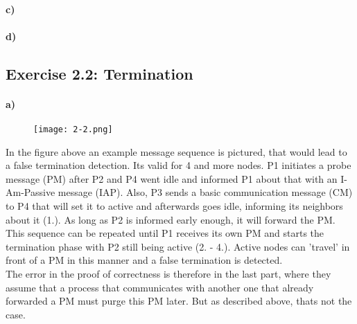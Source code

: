 \documentclass[12pt,a4paper]{article}
\begin{document}
\paragraph{c)} %
\paragraph{d)} %

\subsection*{Exercise 2.2: Termination}
\paragraph*{a)} %
\begin{figure}[h]
\centering
 \texttt{[image: 2-2.png]}
\end{figure}
In the figure above an example message sequence is pictured, that would lead to a false termination detection. Its valid for 4
and more nodes. P1 initiates a probe message (PM) after P2 and P4 went idle and informed P1 about that with an I-Am-Passive
message (IAP). Also, P3 sends a basic communication message (CM) to P4 that will set it to active and afterwards goes idle,
informing its neighbors about it (1.). As long as P2 is informed early enough, it will forward the PM. This sequence can be
repeated until P1 receives its own PM and starts the termination phase with P2 still being active (2. - 4.). Active nodes can
'travel' in front of a PM in this manner and a false termination is detected. \\
The error in the proof of correctness is therefore in the last part, where they assume that a process that communicates with
another one that already forwarded a PM must purge this PM later. But as described above, thats not the case.
\end{document}
